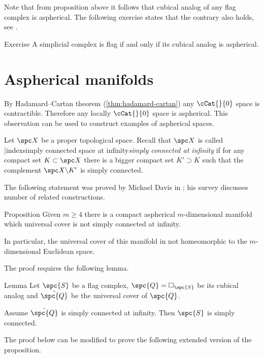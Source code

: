 Note that from proposition above it follows that cubical analog
of any flag complex is aspherical.
The following exercise states that the  contrary also holds, see \cite[5.4]{davis-survey}.

\begin{thm}{Exercise}
A simplicial complex is flag 
if and only if its cubical analog is aspherical.
\end{thm}

\section{Aspherical manifolds}


By Hadamard--Cartan theorem (\ref{thm:hadamard-cartan})
any $\cCat{}{0}$ space is contractible.
Therefore any locally $\cCat{}{0}$ space is aspherical.
This observation can be used to construct examples of aspherical spaces. 

Let $\spc X$ be a proper topological space.
Recall that $\spc X$ is called |index{simply connected space at infinity}\emph{simply connected at infinity} 
if for any compact set $K\subset\spc X$
there is a bigger compact set $K'\supset K$
such that the complement $\spc X\backslash K'$
is simply connected.

The following statement was proved by Michael Davis in \cite{davis-noneuclidean}; 
his survey \cite{davis-survey} discusses number of related constructions.

\begin{thm}{Proposition}\label{prop:aspherical}
Given $m\ge 4$ there is a compact aspherical $m$-dimensional manifold
which universal cover is not simply connected at infinity.

In particular, the universal cover of this manifold in not homeomorphic to the $m$-dimensional Euclidean space.
\end{thm}

The proof requires the following lemma.

\begin{thm}{Lemma}\label{lem:example-pi_infty}
Let $\spc{S}$ be a flag complex,
$\spc{Q}=\square_{\spc{S}}$ be its cubical analog
and $\tilde{\spc{Q}}$ be the universal cover of $\spc{Q}$.

Assume  $\tilde{\spc{Q}}$ is simply connected at infinity.
Then $\spc{S}$ is simply connected.
\end{thm}

The proof below can be modified to prove the following extended version of the proposition. 

